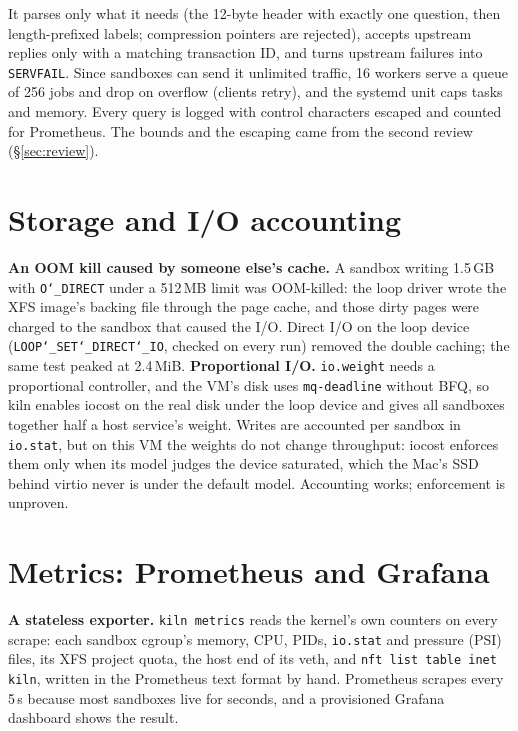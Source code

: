 \documentclass[10pt,letterpaper]{article}
\newcommand{\code}[1]{\texttt{#1}}
\newcommand{\us}{\char`\_}
\begin{document}
It parses only what it needs (the 12-byte header with exactly one question, then
length-prefixed labels; compression pointers are rejected), accepts upstream
replies only with a matching transaction ID, and turns upstream failures into
\code{SERVFAIL}. Since sandboxes can send it unlimited traffic, 16 workers serve
a queue of 256 jobs and drop on overflow (clients retry), and the systemd unit
caps tasks and memory. Every query is logged with control characters escaped and
counted for Prometheus. The bounds and the escaping came from the second review
(\S\ref{sec:review}).

\section{Storage and I/O accounting}
\label{sec:io}

\textbf{An OOM kill caused by someone else's cache.} A sandbox writing 1.5\,GB
with \code{O\us{}DIRECT} under a 512\,MB limit was OOM-killed: the loop driver
wrote the XFS image's backing file through the page cache, and those dirty pages
were charged to the sandbox that caused the I/O. Direct I/O on the loop device
(\code{LOOP\us{}SET\us{}DIRECT\us{}IO}, checked on every run) removed the double
caching; the same test peaked at 2.4\,MiB. \textbf{Proportional I/O.}
\code{io.weight} needs a proportional controller, and the VM's disk uses
\code{mq-deadline} without BFQ, so kiln enables iocost on the real disk under the
loop device and gives all sandboxes together half a host service's weight.
Writes are accounted per sandbox in \code{io.stat}, but on this VM the weights do
not change throughput: iocost enforces them only when its model judges the
device saturated, which the Mac's SSD behind virtio never is under the default
model. Accounting works; enforcement is unproven.

\section{Metrics: Prometheus and Grafana}

\textbf{A stateless exporter.} \code{kiln metrics} reads the kernel's own
counters on every scrape: each sandbox cgroup's memory, CPU, PIDs, \code{io.stat}
and pressure (PSI) files, its XFS project quota, the host end of its veth, and
\code{nft list table inet kiln}, written in the Prometheus text format by hand.
Prometheus scrapes every 5\,s because most sandboxes live for seconds, and a
provisioned Grafana dashboard shows the result.
\end{document}
